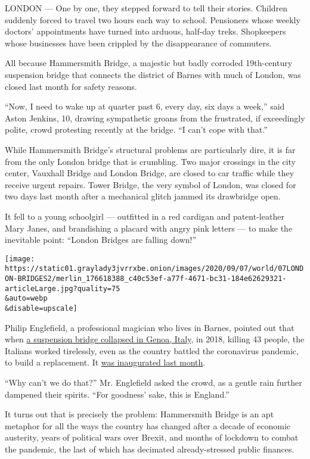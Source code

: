 LONDON --- One by one, they stepped forward to tell their stories.
Children suddenly forced to travel two hours each way to school.
Pensioners whose weekly doctors' appointments have turned into arduous,
half-day treks. Shopkeepers whose businesses have been crippled by the
disappearance of commuters.

All because Hammersmith Bridge, a majestic but badly corroded
19th-century suspension bridge that connects the district of Barnes with
much of London, was closed last month for safety reasons.

``Now, I need to wake up at quarter past 6, every day, six days a
week,'' said Aston Jenkins, 10, drawing sympathetic groans from the
frustrated, if exceedingly polite, crowd protesting recently at the
bridge. ``I can't cope with that.''

While Hammersmith Bridge's structural problems are particularly dire, it
is far from the only London bridge that is crumbling. Two major
crossings in the city center, Vauxhall Bridge and London Bridge, are
closed to car traffic while they receive urgent repairs. Tower Bridge,
the very symbol of London, was closed for two days last month after a
mechanical glitch jammed its drawbridge open.

It fell to a young schoolgirl --- outfitted in a red cardigan and
patent-leather Mary Janes, and brandishing a placard with angry pink
letters --- to make the inevitable point: ``London Bridges are falling
down!''

\texttt{[image: https://static01.graylady3jvrrxbe.onion/images/2020/09/07/world/07LONDON-BRIDGES2/merlin\_176618388\_c40c53ef-a77f-4671-bc31-184e62629321-articleLarge.jpg?quality=75\\\&auto=webp\\\&disable=upscale]}

Philip Englefield, a professional magician who lives in Barnes, pointed
out that when
\href{https://www.nytimes3xbfgragh.onion/interactive/2018/09/06/world/europe/genoa-italy-bridge.html}{a
suspension bridge collapsed in Genoa, Italy}, in 2018, killing 43
people, the Italians worked tirelessly, even as the country battled the
coronavirus pandemic, to build a replacement. It
\href{https://www.nytimes3xbfgragh.onion/2020/08/03/world/europe/genoa-italy-new-bridge.html}{was
inaugurated last month}.

``Why can't we do that?'' Mr. Englefield asked the crowd, as a gentle
rain further dampened their spirits. ``For goodness' sake, this is
England.''

It turns out that is precisely the problem: Hammersmith Bridge is an apt
metaphor for all the ways the country has changed after a decade of
economic austerity, years of political wars over Brexit, and months of
lockdown to combat the pandemic, the last of which has decimated
already-stressed public finances.

